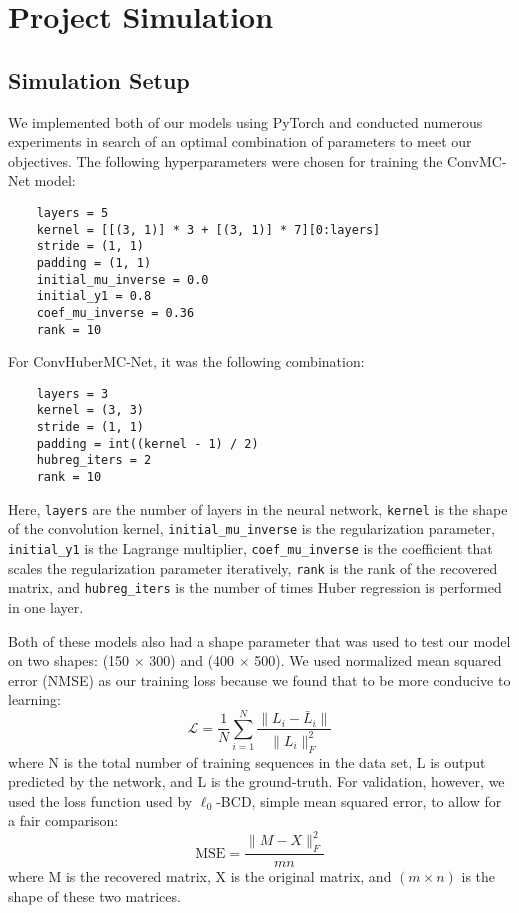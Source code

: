 
\chapter{Project Simulation} %
\label{Chapter4}
\lhead{} %

\section{Simulation Setup}
We implemented both of our models using PyTorch and conducted numerous experiments in search of an optimal combination of parameters to meet our objectives. The following hyperparameters were chosen for training the ConvMC-Net model:
\begin{verbatim}
    layers = 5
    kernel = [[(3, 1)] * 3 + [(3, 1)] * 7][0:layers]
    stride = (1, 1)
    padding = (1, 1)
    initial_mu_inverse = 0.0
    initial_y1 = 0.8
    coef_mu_inverse = 0.36
    rank = 10
\end{verbatim}

For ConvHuberMC-Net, it was the following combination:
\begin{verbatim}
    layers = 3
    kernel = (3, 3)
    stride = (1, 1)
    padding = int((kernel - 1) / 2)
    hubreg_iters = 2
    rank = 10
\end{verbatim}

Here, \verb|layers| are the number of layers in the neural network, \verb|kernel| is the shape of the convolution kernel, \verb|initial_mu_inverse| is the regularization parameter, \verb|initial_y1| is the Lagrange multiplier, \verb|coef_mu_inverse| is the coefficient that scales the regularization parameter iteratively, \verb|rank| is the rank of the recovered matrix, and \verb|hubreg_iters| is the number of times Huber regression is performed in one layer.

Both of these models also had a shape parameter that was used to test our model on two shapes: (150 \(\times\) 300) and (400 \(\times\) 500). We used normalized mean squared error (NMSE) as our training loss because we found that to be more conducive to learning: \[\mathcal{L} = \frac{1}{N}\sum_{i = 1}^N\frac{\|L_i - \bar L_i\|}{\|L_i\|_F^2}\] where N is the total number of training sequences in the data set, L is output predicted by the network, and L is the ground-truth. For validation, however, we used the loss function used by \(\ell_0\)-BCD, simple mean squared error, to allow for a fair comparison: \[\text{MSE} = \frac{\|M - X\|_F^2}{mn}\] where M is the recovered matrix, X is the original matrix, and \((m \times n)\) is the shape of these two matrices.

